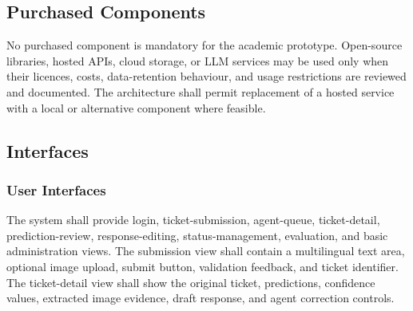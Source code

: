 \documentclass[10pt,letterpaper]{article}
\newenvironment{templatebody}{\par\justifying\setlength{\emergencystretch}{3em}}{\par}
\begin{document}
\begin{templatebody}
\subsection{Purchased Components}
No purchased component is mandatory for the academic prototype. Open-source libraries, hosted APIs, cloud storage, or LLM services may be used only when their licences, costs, data-retention behaviour, and usage restrictions are reviewed and documented. The architecture shall permit replacement of a hosted service with a local or alternative component where feasible.

\subsection{Interfaces}

\subsubsection{User Interfaces}
The system shall provide login, ticket-submission, agent-queue, ticket-detail, prediction-review, response-editing, status-management, evaluation, and basic administration views. The submission view shall contain a multilingual text area, optional image upload, submit button, validation feedback, and ticket identifier. The ticket-detail view shall show the original ticket, predictions, confidence values, extracted image evidence, draft response, and agent correction controls.

\begin{figure}[H]
\centering
{}
\end{figure}
\end{templatebody}
\end{document}
